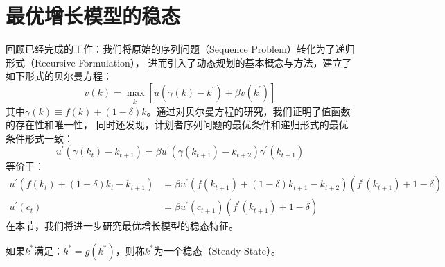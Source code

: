 
\section{最优增长模型的稳态}    \label{sec-steady}

回顾已经完成的工作：我们将原始的序列问题（Sequence Problem）转化为了递归形式（Recursive Formulation），
进而引入了动态规划的基本概念与方法，建立了如下形式的贝尔曼方程：
$$
v\left(k\right)=\max _{k^{\prime}}\left[u\left(\gamma\left(k\right)-k^{\prime}\right)+\beta v\left(k^{\prime}\right)\right]
$$
其中$\gamma\left(k\right)\equiv f\left(k\right)+\left(1-\delta\right)k$。通过对贝尔曼方程的研究，我们证明了值函数的存在性和唯一性，
同时还发现，计划者序列问题的最优条件和递归形式的最优条件形式一致：
\begin{equation*}    
    u^{\prime}\left(\gamma\left(k_t\right)-k_{t+1}\right) = 
        \beta u^{\prime}\left(\gamma\left(k_{t+1}\right)-k_{t+2}\right)\gamma^{\prime}\left(k_{t+1}\right)
\end{equation*}
等价于：
\begin{equation*}
    \begin{aligned}
        u^{\prime}\left(f\left(k_t\right)+\left(1-\delta\right)k_t-k_{t+1}\right) &= 
        \beta u^{\prime}\left(f\left(k_{t+1}\right)+\left(1-\delta\right)k_{t+1}-k_{t+2}\right)\left(f^{\prime}\left(k_{t+1}\right)+1-\delta\right) \\
        u^{\prime}\left(c_t\right)&=\beta u^{\prime}\left(c_{t+1}\right)\left(f^{\prime}\left(k_{t+1}\right)+1-\delta\right)
    \end{aligned}
\end{equation*}
在本节，我们将进一步研究最优增长模型的稳态特征。

\begin{definition}[\textbf{稳态}]
    如果$k^*$满足：$k^*=g(k^*)$，则称$k^*$为一个稳态（Steady State）。
\end{definition}

